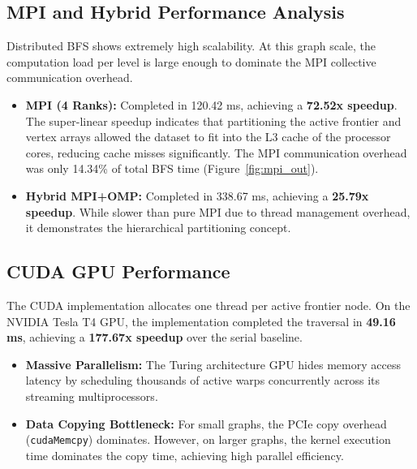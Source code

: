 \documentclass[12pt, a4paper]{article}
\begin{document}
\subsection{MPI and Hybrid Performance Analysis}
Distributed BFS shows extremely high scalability. At this graph scale, the computation load per level is large enough to dominate the MPI collective communication overhead.
\begin{itemize}[leftmargin=*]
    \item \textbf{MPI (4 Ranks):} Completed in 120.42 ms, achieving a \textbf{72.52x speedup}. The super-linear speedup indicates that partitioning the active frontier and vertex arrays allowed the dataset to fit into the L3 cache of the processor cores, reducing cache misses significantly. The MPI communication overhead was only 14.34\% of total BFS time (Figure~\ref{fig:mpi_out}).
    \item \textbf{Hybrid MPI+OMP:} Completed in 338.67 ms, achieving a \textbf{25.79x speedup}. While slower than pure MPI due to thread management overhead, it demonstrates the hierarchical partitioning concept.
\end{itemize}

\subsection{CUDA GPU Performance}
The CUDA implementation allocates one thread per active frontier node. On the NVIDIA Tesla T4 GPU, the implementation completed the traversal in \textbf{49.16 ms}, achieving a \textbf{177.67x speedup} over the serial baseline.
\begin{itemize}[leftmargin=*]
    \item \textbf{Massive Parallelism:} The Turing architecture GPU hides memory access latency by scheduling thousands of active warps concurrently across its streaming multiprocessors.
    \item \textbf{Data Copying Bottleneck:} For small graphs, the PCIe copy overhead (\texttt{cudaMemcpy}) dominates. However, on larger graphs, the kernel execution time dominates the copy time, achieving high parallel efficiency.
\end{itemize}
\end{document}
